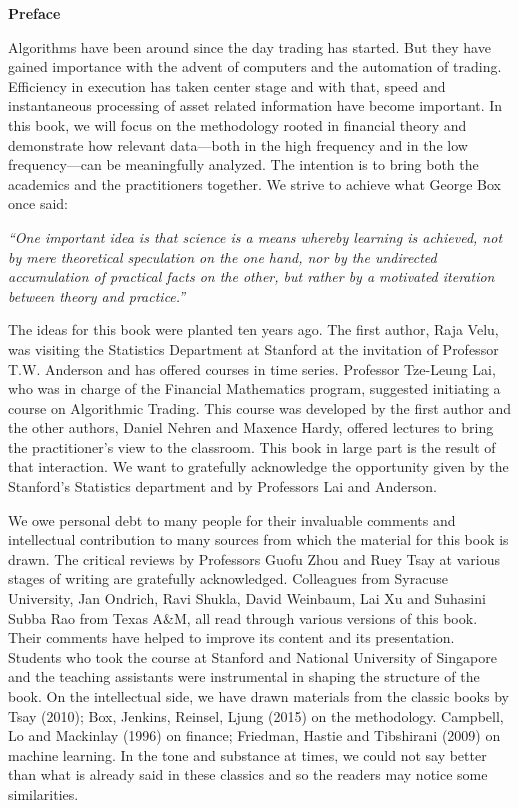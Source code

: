 \begin{center} {\large\bfseries Preface} \end{center}


Algorithms have been around since the day trading has started. But they have gained importance with the advent of computers and the automation of trading. Efficiency in execution has taken center stage and with that, speed and instantaneous processing of asset related information have become important. In this book, we will focus on the methodology rooted in financial theory and demonstrate how relevant data---both in the high frequency and in the low frequency---can be meaningfully analyzed. The intention is to bring both the academics and the practitioners together. We strive to achieve what George Box once said: \par
        \begin{center}
        \begin{minipage}[t]{0.7\textwidth}
        	\raggedright
          	{\itshape``One important idea is that science is a means whereby learning is achieved, not by mere theoretical speculation on the one hand, nor by the undirected accumulation of practical facts on the other, but rather by a motivated iteration between theory and practice.''}
        \end{minipage} 
        \end{center}


The ideas for this book were planted ten years ago. The first author, Raja Velu, was visiting the Statistics Department at Stanford at the invitation of Professor T.W. Anderson and has offered courses in time series. Professor Tze-Leung Lai, who was in charge of the Financial Mathematics program, suggested initiating a course on Algorithmic Trading. This course was developed by the first author and the other authors, Daniel Nehren and Maxence Hardy, offered lectures to bring the practitioner's view to the classroom. This book in large part is the result of that interaction. We want to gratefully acknowledge the opportunity given by the Stanford's Statistics department and by Professors Lai and Anderson. 


We owe personal debt to many people for their invaluable comments and intellectual contribution to many sources from which the material for this book is drawn. The critical reviews by Professors Guofu Zhou and Ruey Tsay at various stages of writing are gratefully acknowledged. Colleagues from Syracuse University, Jan Ondrich, Ravi Shukla, David Weinbaum, Lai Xu and Suhasini Subba Rao from Texas A\&M, all read through various versions of this book. Their comments have helped to improve its content and its presentation. Students who took the course at Stanford and National University of Singapore and the teaching assistants were instrumental in shaping the structure of the book. On the intellectual side, we have drawn materials from the classic books by Tsay (2010); Box, Jenkins, Reinsel, Ljung (2015) on the methodology. Campbell, Lo and Mackinlay (1996) on finance; Friedman, Hastie and Tibshirani (2009) on machine learning. In the tone and substance at times, we could not say better than what is already said in these classics and so the readers may notice some similarities.


